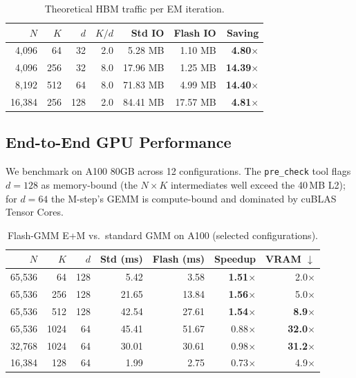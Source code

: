 \documentclass[sigconf,nonacm]{acmart}
\begin{document}
\begin{table}[h]
\centering
\caption{Theoretical HBM traffic per EM iteration.}
\label{tab:gmm-io}
\setlength{\tabcolsep}{4pt}
\small
\begin{tabular}{rrrrrrr}
\toprule
$N$ & $K$ & $d$ & $K/d$ & Std IO & Flash IO & Saving \\
\midrule
4{,}096  & 64  & 32  & 2.0 & 5.28 MB  & 1.10 MB  & \textbf{4.80$\times$}  \\
4{,}096  & 256 & 32  & 8.0 & 17.96 MB & 1.25 MB  & \textbf{14.39$\times$} \\
8{,}192  & 512 & 64  & 8.0 & 71.83 MB & 4.99 MB  & \textbf{14.40$\times$} \\
16{,}384 & 256 & 128 & 2.0 & 84.41 MB & 17.57 MB & \textbf{4.81$\times$}  \\
\bottomrule
\end{tabular}
\end{table}

\subsection{End-to-End GPU Performance}

We benchmark on A100 80GB across 12 configurations. The
\texttt{pre\_check} tool flags $d{=}128$ as memory-bound (the $N{\times}K$
intermediates well exceed the 40\,MB L2); for $d{=}64$ the M-step's GEMM
is compute-bound and dominated by cuBLAS Tensor Cores.

\begin{table}[h]
\centering
\caption{Flash-GMM E+M vs.\ standard GMM on A100 (selected configurations).}
\label{tab:gmm-gpu}
\setlength{\tabcolsep}{3.5pt}
\small
\begin{tabular}{rrrrrrr}
\toprule
$N$ & $K$ & $d$ & Std (ms) & Flash (ms) & Speedup & VRAM $\downarrow$ \\
\midrule
65{,}536 & 64   & 128 & 5.42  & 3.58  & \textbf{1.51$\times$} & 2.0$\times$ \\
65{,}536 & 256  & 128 & 21.65 & 13.84 & \textbf{1.56$\times$} & 5.0$\times$ \\
65{,}536 & 512  & 128 & 42.54 & 27.61 & \textbf{1.54$\times$} & \textbf{8.9$\times$} \\
65{,}536 & 1024 & 64  & 45.41 & 51.67 & 0.88$\times$          & \textbf{32.0$\times$} \\
32{,}768 & 1024 & 64  & 30.01 & 30.61 & 0.98$\times$          & \textbf{31.2$\times$} \\
16{,}384 & 128  & 64  & 1.99  & 2.75  & 0.73$\times$          & 4.9$\times$ \\
\bottomrule
\end{tabular}
\end{table}
\end{document}
